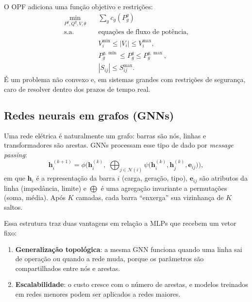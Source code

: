 \documentclass[10pt,a4paper,oneside]{article}
\begin{document}
O OPF adiciona uma função objetivo e restrições:
\begin{equation}
\begin{aligned}
  \min_{P^g, Q^g, V, \theta} \quad & \sum_{g} c_g(P^g_g) \\
  \text{s.a.} \quad & \text{equações de fluxo de potência}, \\
  & V_i^{\min} \le |V_i| \le V_i^{\max}, \\
  & P^{g,\min}_g \le P^g_g \le P^{g,\max}_g, \\
  & |S_{ij}| \le S_{ij}^{\max}.
\end{aligned}
\end{equation}
É um problema não convexo e, em sistemas grandes com restrições de
segurança, caro de resolver dentro dos prazos de tempo real.

\subsection{Redes neurais em grafos (GNNs)}

Uma rede elétrica é naturalmente um grafo: barras são nós, linhas e
transformadores são arestas. GNNs processam esse tipo de dado por
\textit{message passing}:
\begin{equation}
  \mathbf{h}_i^{(k+1)} = \phi\Big(\mathbf{h}_i^{(k)},\;
  \bigoplus_{j \in \mathcal{N}(i)} \psi\big(\mathbf{h}_i^{(k)}, \mathbf{h}_j^{(k)}, \mathbf{e}_{ij}\big)\Big),
\end{equation}
em que $\mathbf{h}_i$ é a representação da barra $i$ (carga, geração, tipo),
$\mathbf{e}_{ij}$ são atributos da linha (impedância, limite) e $\bigoplus$ é
uma agregação invariante a permutações (soma, média). Após $K$ camadas, cada
barra ``enxerga'' sua vizinhança de $K$ saltos.

Essa estrutura traz duas vantagens em relação a MLPs que recebem um vetor
fixo:
\begin{enumerate}
  \item \textbf{Generalização topológica}: a mesma GNN funciona quando uma
    linha sai de operação ou quando a rede muda, porque os parâmetros são
    compartilhados entre nós e arestas.
  \item \textbf{Escalabilidade}: o custo cresce com o número de arestas, e
    modelos treinados em redes menores podem ser aplicados a redes maiores.
\end{enumerate}
\end{document}

